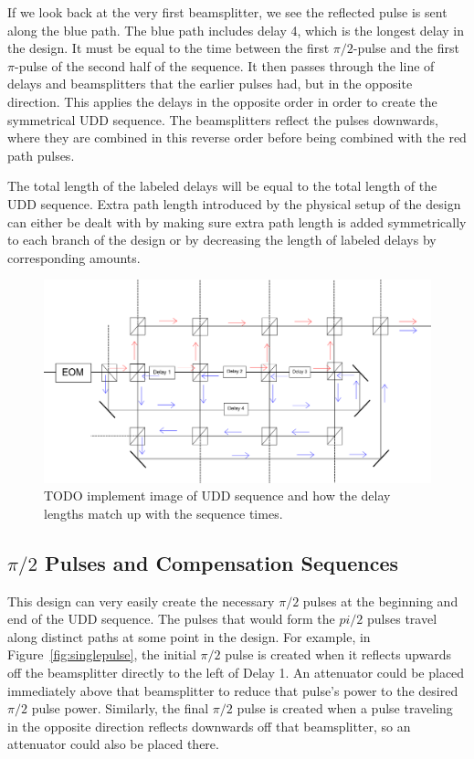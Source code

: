 \documentclass[pdftex,12pt,a4paper]{article}
\begin{document}
If we look back at the very first beamsplitter, we see the reflected pulse is sent along the blue path. The blue path includes delay 4, which is the longest delay in the design. It must be equal to the time between the first $\pi/2$-pulse and the first $\pi$-pulse of the second half of the sequence. It then passes through the line of delays and beamsplitters that the earlier pulses had, but in the opposite direction. This applies the delays in the opposite order in order to create the symmetrical UDD sequence. The beamsplitters reflect the pulses downwards, where they are combined in this reverse order before being combined with the red path pulses.

The total length of the labeled delays will be equal to the total length of the UDD sequence. Extra path length introduced by the physical setup of the design can either be dealt with by making sure extra path length is added symmetrically to each branch of the design or by decreasing the length of labeled delays by corresponding amounts.

\begin{figure}[H]
\centering
\includegraphics[width=\textwidth]{singlepulse.png}
\caption{TODO implement image of UDD sequence and how the delay lengths match up with the sequence times.}
\label{fig:UDDseqdelays}
\end{figure}

\subsection{$\pi/2$ Pulses and Compensation Sequences}
This design can very easily create the necessary $\pi/2$ pulses at the beginning and end of the UDD sequence. The pulses that would form the $pi/2$ pulses travel along distinct paths at some point in the design. For example, in Figure~\ref{fig:singlepulse}, the initial $\pi/2$ pulse is created when it reflects upwards off the beamsplitter directly to the left of Delay 1. An attenuator could be placed immediately above that beamsplitter to reduce that pulse's power to the desired $\pi/2$ pulse power. Similarly, the final $\pi/2$ pulse is created when a pulse traveling in the opposite direction reflects downwards off that beamsplitter, so an attenuator could also be placed there.
\end{document}

